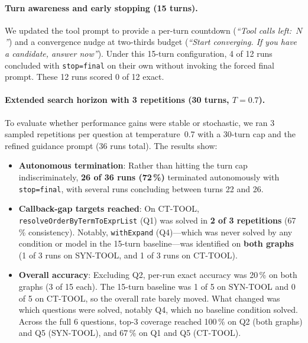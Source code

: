 \paragraph{Turn awareness and early stopping (15 turns).}
We updated the tool prompt to provide a per-turn countdown (\emph{``Tool calls left:~$N$''})
and a convergence nudge at two-thirds budget (\emph{``Start converging. If you have a candidate, answer now''}).
Under this 15-turn configuration, 4 of 12 runs concluded with \texttt{stop=final} on their
own without invoking the forced final prompt.
These 12 runs scored 0 of 12 exact.

\paragraph{Extended search horizon with 3 repetitions (30 turns, $T=0.7$).}
To evaluate whether performance gains were stable or stochastic, we ran 3 sampled repetitions
per question at temperature~0.7 with a 30-turn cap and the refined guidance prompt (36 runs total).
The results show:
\begin{itemize}
  \item \textbf{Autonomous termination}: Rather than hitting the turn cap indiscriminately,
    \textbf{26 of 36 runs (72\,\%)} terminated autonomously with \texttt{stop=final},
    with several runs concluding between turns 22 and 26.
  \item \textbf{Callback-gap targets reached}: On \textsc{CT-TOOL}, \texttt{resolveOrderByTermToExprList} (Q1)
    was solved in \textbf{2 of 3 repetitions} (67\,\% consistency).
    Notably, \texttt{withExpand} (Q4)---which was never solved by any condition or model in the
    15-turn baseline---was identified on \textbf{both graphs} (1 of 3 runs on \textsc{SYN-TOOL},
    and 1 of 3 runs on \textsc{CT-TOOL}).
  \item \textbf{Overall accuracy}: Excluding Q2, per-run exact accuracy was 20\,\% on both graphs
    (3 of 15 each). The 15-turn baseline was 1 of 5 on \textsc{SYN-TOOL} and 0 of 5 on \textsc{CT-TOOL},
    so the overall rate barely moved. What changed was which questions were solved, notably Q4,
    which no baseline condition solved. Across the full 6 questions, top-3 coverage reached 100\,\%
    on Q2 (both graphs) and Q5 (\textsc{SYN-TOOL}), and 67\,\% on Q1 and Q5 (\textsc{CT-TOOL}).
\end{itemize}

